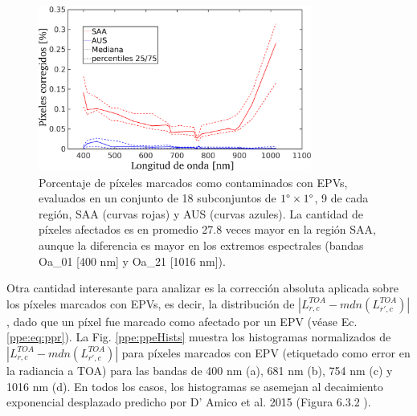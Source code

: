     
    \begin{figure}
    \centering
    \includegraphics[width=0.8\textwidth]{ppe/figures/ppeBands}
    \caption[Porcentaje de píxeles marcados como contaminados con EPVs, calculados sobre prociones de imágenes en las regiones SAA y AUS.]{Porcentaje de píxeles marcados como contaminados con EPVs, evaluados en un conjunto de 18 subconjuntos de $1 \degree \times 1 \degree$, 9 de cada región, SAA (curvas rojas) y AUS (curvas azules). La cantidad de píxeles afectados es en promedio 27.8 veces mayor en la región SAA, aunque la diferencia es mayor en los extremos espectrales (bandas Oa\_01 [400 nm] y Oa\_21 [1016 nm]).}
    \label{ppe:ppeBands}
    \end{figure}
    
    Otra cantidad interesante para analizar es la corrección absoluta aplicada sobre los píxeles marcados con EPVs, es decir, la distribución de $|L^{TOA}_{r,c}-mdn(L^{TOA}_{r',c})|$, dado que un píxel fue marcado como afectado por un EPV (véase Ec. \ref{ppe:eq:ppr}). La Fig. \ref{ppe:ppeHists} muestra los histogramas normalizados de $|L^{TOA}_{r,c}-mdn(L^{TOA}_{r',c})|$ para píxeles marcados con EPV (etiquetado como error en la radiancia a TOA) para las bandas de 400 nm (a), 681 nm (b), 754 nm (c) y 1016 nm (d). En todos los casos, los histogramas se asemejan al decaimiento exponencial desplazado predicho por D' Amico et al. 2015 (Figura 6.3.2 \cite{damico2015}).


